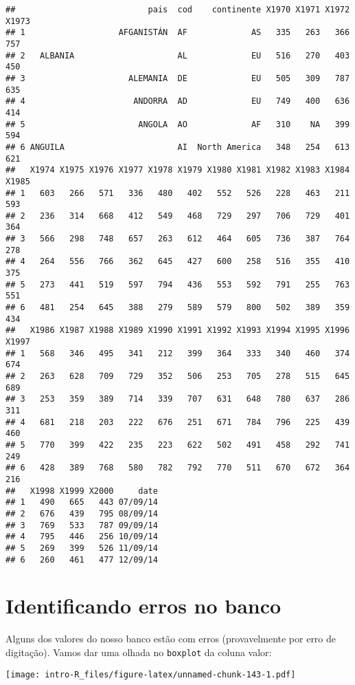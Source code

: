 \documentclass[]{book}
\theoremstyle{definition}
\theoremstyle{definition}
\theoremstyle{definition}
\theoremstyle{remark}
\begin{document}
\begin{verbatim}
##                           pais  cod    continente X1970 X1971 X1972 X1973
## 1                   AFGANISTÁN  AF             AS   335   263   366   757
## 2   ALBANIA                     AL             EU   516   270   403   450
## 3                     ALEMANIA  DE             EU   505   309   787   635
## 4                      ANDORRA  AD             EU   749   400   636   414
## 5                       ANGOLA  AO             AF   310    NA   399   594
## 6 ANGUILA                       AI  North America   348   254   613   621
##   X1974 X1975 X1976 X1977 X1978 X1979 X1980 X1981 X1982 X1983 X1984 X1985
## 1   603   266   571   336   480   402   552   526   228   463   211   593
## 2   236   314   668   412   549   468   729   297   706   729   401   364
## 3   566   298   748   657   263   612   464   605   736   387   764   278
## 4   264   556   766   362   645   427   600   258   516   355   410   375
## 5   273   441   519   597   794   436   553   592   791   255   763   551
## 6   481   254   645   388   279   589   579   800   502   389   359   434
##   X1986 X1987 X1988 X1989 X1990 X1991 X1992 X1993 X1994 X1995 X1996 X1997
## 1   568   346   495   341   212   399   364   333   340   460   374   674
## 2   263   628   709   729   352   506   253   705   278   515   645   689
## 3   253   359   389   714   339   707   631   648   780   637   286   311
## 4   681   218   203   222   676   251   671   784   796   225   439   460
## 5   770   399   422   235   223   622   502   491   458   292   741   249
## 6   428   389   768   580   782   792   770   511   670   672   364   216
##   X1998 X1999 X2000     date
## 1   490   665   443 07/09/14
## 2   676   439   795 08/09/14
## 3   769   533   787 09/09/14
## 4   795   446   256 10/09/14
## 5   269   399   526 11/09/14
## 6   260   461   477 12/09/14
\end{verbatim}

\hypertarget{identificando-erros-no-banco}{%
\section{Identificando erros no banco}\label{identificando-erros-no-banco}}

Alguns dos valores do nosso banco estão com erros (provavelmente por erro de digitação). Vamos dar uma olhada no \texttt{boxplot} da coluna valor:

\texttt{[image: intro-R\_files/figure-latex/unnamed-chunk-143-1.pdf]}
\end{document}
